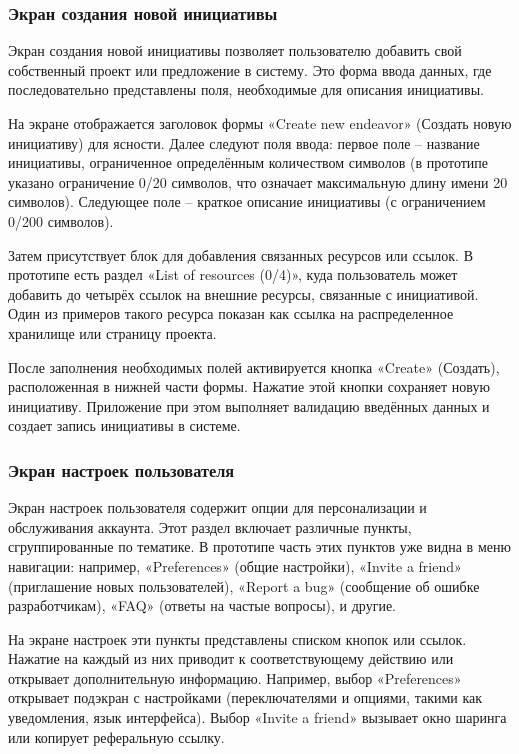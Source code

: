 \documentclass[
    candidate, %
    subf, %
    dotsinheaders=false,
]{disser}
\begin{document}
\subsubsection{Экран создания новой инициативы}

Экран создания новой инициативы позволяет пользователю добавить свой собственный проект или предложение в систему. Это форма ввода данных, где последовательно представлены поля, необходимые для описания инициативы.

На экране отображается заголовок формы «Create new endeavor» (Создать новую инициативу) для ясности. Далее следуют поля ввода: первое поле – название инициативы, ограниченное определённым количеством символов (в прототипе указано ограничение 0/20 символов, что означает максимальную длину имени 20 символов). Следующее поле – краткое описание инициативы (с ограничением 0/200 символов).

Затем присутствует блок для добавления связанных ресурсов или ссылок. В прототипе есть раздел «List of resources (0/4)», куда пользователь может добавить до четырёх ссылок на внешние ресурсы, связанные с инициативой. Один из примеров такого ресурса показан как ссылка на распределенное хранилище или страницу проекта.

После заполнения необходимых полей активируется кнопка «Create» (Создать), расположенная в нижней части формы. Нажатие этой кнопки сохраняет новую инициативу. Приложение при этом выполняет валидацию введённых данных и создает запись инициативы в системе.

\subsubsection{Экран настроек пользователя}

Экран настроек пользователя содержит опции для персонализации и обслуживания аккаунта. Этот раздел включает различные пункты, сгруппированные по тематике. В прототипе часть этих пунктов уже видна в меню навигации: например, «Preferences» (общие настройки), «Invite a friend» (приглашение новых пользователей), «Report a bug» (сообщение об ошибке разработчикам), «FAQ» (ответы на частые вопросы), и другие.

На экране настроек эти пункты представлены списком кнопок или ссылок. Нажатие на каждый из них приводит к соответствующему действию или открывает дополнительную информацию. Например, выбор «Preferences» открывает подэкран с настройками (переключателями и опциями, такими как уведомления, язык интерфейса). Выбор «Invite a friend» вызывает окно шаринга или копирует реферальную ссылку.
\end{document}
